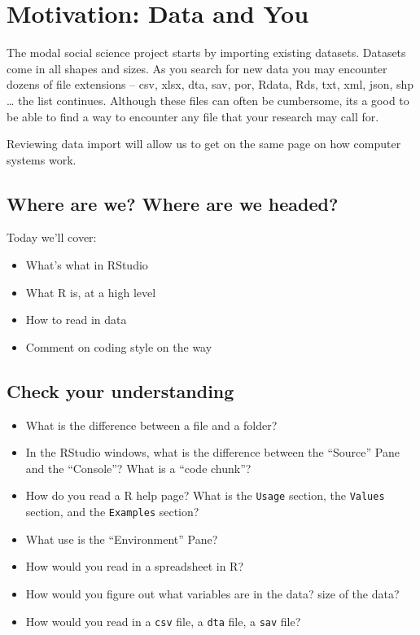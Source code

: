 \documentclass[
]{book}
\providecommand{\tightlist}{%
  \setlength{\itemsep}{0pt}\setlength{\parskip}{0pt}}
\theoremstyle{definition}
\theoremstyle{definition}
\theoremstyle{definition}
\theoremstyle{definition}
\theoremstyle{remark}
\begin{document}
\hypertarget{motivation-data-and-you}{%
\section*{Motivation: Data and You}\label{motivation-data-and-you}}

The modal social science project starts by importing existing datasets. Datasets come in all shapes and sizes. As you search for new data you may encounter dozens of file extensions -- csv, xlsx, dta, sav, por, Rdata, Rds, txt, xml, json, shp \ldots{} the list continues. Although these files can often be cumbersome, its a good to be able to find a way to encounter any file that your research may call for.

Reviewing data import will allow us to get on the same page on how computer systems work.

\hypertarget{where-are-we-where-are-we-headed}{%
\subsection*{Where are we? Where are we headed?}\label{where-are-we-where-are-we-headed}}

Today we'll cover:

\begin{itemize}
\tightlist
\item
  What's what in RStudio
\item
  What R is, at a high level
\item
  How to read in data
\item
  Comment on coding style on the way
\end{itemize}

\hypertarget{check-your-understanding}{%
\subsection*{Check your understanding}\label{check-your-understanding}}

\begin{itemize}
\tightlist
\item
  What is the difference between a file and a folder?
\item
  In the RStudio windows, what is the difference between the ``Source'' Pane and the ``Console''? What is a ``code chunk''?
\item
  How do you read a R help page? What is the \texttt{Usage} section, the \texttt{Values} section, and the \texttt{Examples} section?
\item
  What use is the ``Environment'' Pane?
\item
  How would you read in a spreadsheet in R?
\item
  How would you figure out what variables are in the data? size of the data?
\item
  How would you read in a \texttt{csv} file, a \texttt{dta} file, a \texttt{sav} file?
\end{itemize}
\end{document}
